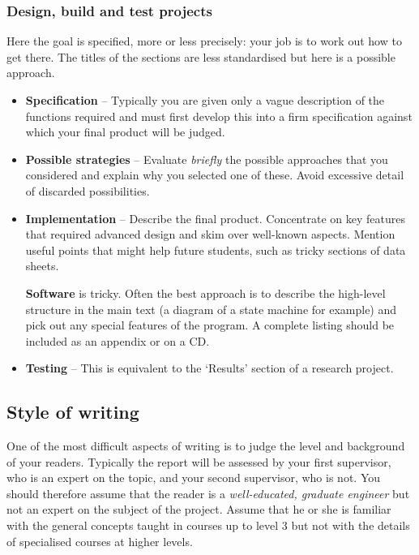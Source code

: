 \documentclass[a4paper,12pt]{article}
\begin{document}
\subsubsection{Design, build and test projects}

Here the goal is specified, more or less precisely: your job is to work out how to get there. The titles of the sections are less standardised but here is a possible approach.
\begin{itemize}
\item
\textbf{Specification} --
Typically you are given only a vague description of the functions required and must first develop this into a firm specification against which your final product will be judged.
\item
\textbf{Possible strategies} --
Evaluate \emph{briefly} the possible approaches that you considered 
and explain why you selected one of these. 
Avoid excessive detail of discarded possibilities.
\item
\textbf{Implementation} --
Describe the final product. Concentrate on key features that required advanced design and skim over well-known aspects. Mention useful points that might help future students, such as tricky sections of data sheets.

\textbf{Software} is tricky. Often the best approach is to describe the high-level structure in the main text (a diagram of a state machine for example) and pick out any special features of the program. A complete listing should be included as an appendix or on a CD.
\item
\textbf{Testing} --
This is equivalent to the `Results' section of a research project. 
\end{itemize}


\subsection{Style of writing}

One of the most difficult aspects of writing is to judge the level and background of your readers. Typically the report will be assessed by your first supervisor, who is an expert on the topic, and your second supervisor, who is not. You should therefore assume that the reader is a \emph{well-educated, graduate engineer} but not an expert on the subject of the project. Assume that he or she is familiar with the general concepts taught in courses up to level 3 but not with the details of specialised courses at higher levels.
\end{document}
